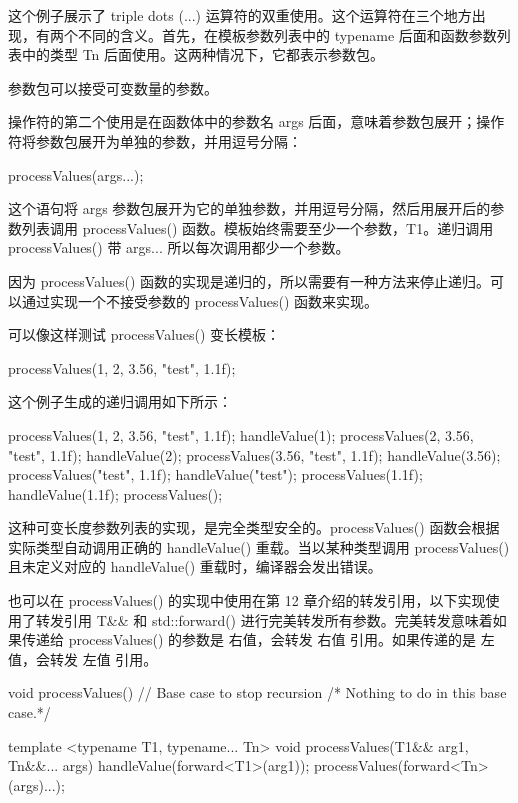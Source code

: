 这个例子展示了 triple dots (...) 运算符的双重使用。这个运算符在三个地方出现，有两个不同的含义。首先，在模板参数列表中的 typename 后面和函数参数列表中的类型 Tn 后面使用。这两种情况下，它都表示参数包。

参数包可以接受可变数量的参数。

操作符的第二个使用是在函数体中的参数名 args 后面，意味着参数包展开；操作符将参数包展开为单独的参数，并用逗号分隔：

\begin{cpp}
processValues(args...);
\end{cpp}

这个语句将 args 参数包展开为它的单独参数，并用逗号分隔，然后用展开后的参数列表调用 processValues() 函数。模板始终需要至少一个参数，T1。递归调用 processValues() 带 args... 所以每次调用都少一个参数。

因为 processValues() 函数的实现是递归的，所以需要有一种方法来停止递归。可以通过实现一个不接受参数的 processValues() 函数来实现。

可以像这样测试 processValues() 变长模板：

\begin{cpp}
processValues(1, 2, 3.56, "test", 1.1f);
\end{cpp}

这个例子生成的递归调用如下所示：

\begin{cpp}
processValues(1, 2, 3.56, "test", 1.1f);
    handleValue(1);
        processValues(2, 3.56, "test", 1.1f);
        handleValue(2);
        processValues(3.56, "test", 1.1f);
            handleValue(3.56);
            processValues("test", 1.1f);
                handleValue("test");
                processValues(1.1f);
                    handleValue(1.1f);
                    processValues();
\end{cpp}

这种可变长度参数列表的实现，是完全类型安全的。processValues() 函数会根据实际类型自动调用正确的 handleValue() 重载。当以某种类型调用 processValues() 且未定义对应的 handleValue() 重载时，编译器会发出错误。

也可以在 processValues() 的实现中使用在第 12 章介绍的转发引用，以下实现使用了转发引用 T\&\& 和 std::forward() 进行完美转发所有参数。完美转发意味着如果传递给 processValues() 的参数是 右值，会转发 右值 引用。如果传递的是 左值，会转发 左值 引用。

\begin{cpp}
void processValues() // Base case to stop recursion
{ /* Nothing to do in this base case.*/ }

template <typename T1, typename... Tn>
void processValues(T1&& arg1, Tn&&... args)
{
    handleValue(forward<T1>(arg1));
    processValues(forward<Tn>(args)...);
}
\end{cpp}

